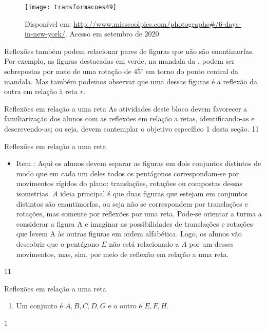 \begin{figure}[H]
\centering

\texttt{[image: transformacoes49]}
\caption{Disponível em: \url{http://www.misscoolpics.com/photographs\#/6-days-in-new-york/}. Acesso em setembro de 2020}
\label{transformacoes49}
\end{figure}

Reflexões também podem relacionar pares de figuras que não são enantimorfas. Por exemplo, as figuras destacadas em verde, na mandala da , podem ser sobrepostas por meio de uma rotação de $45^{\circ}$ em torno do ponto central da mandala.  Mas também podemos observar que uma dessas figuras é a reflexão da outra em relação à reta $r$.
\clearpage
\begin{objectives}{Reflexões em relação a uma reta}
{
As atividades deste bloco devem favorecer a familiarização dos alunos com as reflexões em relação a retas, identificando-as e descrevendo-as; ou seja, devem contemplar o objetivo específico 1 desta seção. 
}{1}{1}
\end{objectives}
\begin{sugestions}{Reflexões em relação a uma reta}
{
\begin{itemize}
\item Item : Aqui os alunos devem separar as figuras em dois conjuntos distintos de modo que em cada um deles todos os pentágonos correspondam-se por movimentos rígidos do plano: translações, rotações ou compostas dessas isometrias. $A$ ideia principal é que duas figuras que estejam em conjuntos distintos são enantimorfas, ou seja não se correspondem por translações e rotações, mas somente por reflexões por uma reta. Pode-se orientar a turma a considerar a figura A e imaginar as possibilidades de translações e rotações que levem A às outras figuras em ordem alfabética. Logo, os alunos vão descobrir que o pentágono $E$ não está relacionado a $A$ por um desses movimentos, mas, sim, por meio de reflexão em relação a uma reta. 
\end{itemize}
}{1}{1}
\end{sugestions}
\begin{answer}{Reflexões em relação a uma reta}
{
\begin{enumerate}
\item Um conjunto é ${A, B, C, D, G}$ e o outro é ${E, F, H}$. 
\end{enumerate}
}{1}
\end{answer}
\clearmargin
